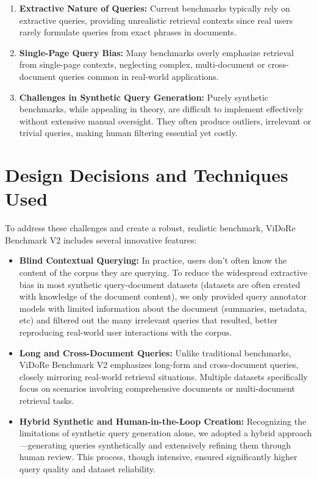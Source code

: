 \begin{enumerate}
  \item \textbf{Extractive Nature of Queries:} Current benchmarks typically rely on extractive queries, providing unrealistic retrieval contexts since real users rarely formulate queries from exact phrases in documents.
  \item \textbf{Single-Page Query Bias:} Many benchmarks overly emphasize retrieval from single-page contexts, neglecting complex, multi-document or cross-document queries common in real-world applications.
  \item \textbf{Challenges in Synthetic Query Generation:} Purely synthetic benchmarks, while appealing in theory, are difficult to implement effectively without extensive manual oversight. They often produce outliers, irrelevant or trivial queries, making human filtering essential yet costly.
\end{enumerate}

\section{Design Decisions and Techniques Used}
To address these challenges and create a robust, realistic benchmark, ViDoRe Benchmark V2 includes several innovative features:

\begin{itemize}
  \item \textbf{Blind Contextual Querying:} In practice, users don’t often know the content of the corpus they are querying. To reduce the widespread extractive bias in most synthetic query-document datasets (datasets are often created with knowledge of the document content), we only provided query annotator models with limited information about the document (summaries, metadata, etc) and filtered out the many irrelevant queries that resulted, better reproducing real-world user interactions with the corpus.
  \item \textbf{Long and Cross-Document Queries:} Unlike traditional benchmarks, ViDoRe Benchmark V2 emphasizes long-form and cross-document queries, closely mirroring real-world retrieval situations. Multiple datasets specifically focus on scenarios involving comprehensive documents or multi-document retrieval tasks.
  \item \textbf{Hybrid Synthetic and Human-in-the-Loop Creation:} Recognizing the limitations of synthetic query generation alone, we adopted a hybrid approach—generating queries synthetically and extensively refining them through human review. This process, though intensive, ensured significantly higher query quality and dataset reliability.
\end{itemize}

